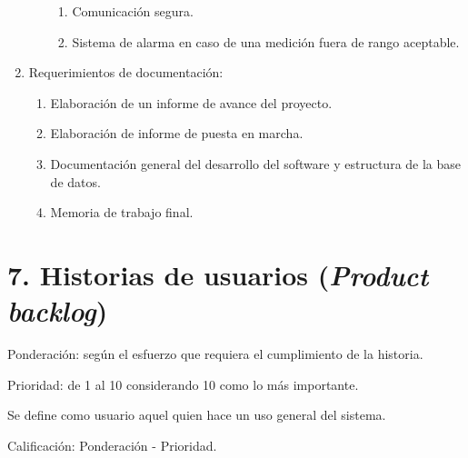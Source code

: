 \documentclass[
11pt, %
codirector, %
]{charter}
\begin{document}
\begin{enumerate}
\begin{enumerate}
\begin{enumerate}
		\item Comunicación segura.
		\item Sistema de alarma en caso de una medición fuera de rango aceptable.
		\end{enumerate}
	\end{enumerate}
\item Requerimientos de documentación:
	\begin{enumerate}
	\item Elaboración de un informe de avance del proyecto.
	\item Elaboración de informe de puesta en marcha.
	\item Documentación general del desarrollo del software y estructura de la base de datos.
	\item Memoria de trabajo final.
	\end{enumerate}	
\end{enumerate}


\section{7. Historias de usuarios (\textit{Product backlog})}
\label{sec:backlog}

Ponderación: según el esfuerzo que requiera el cumplimiento de la historia.

Prioridad: de 1 al 10 considerando 10 como lo más importante.

Se define como usuario aquel quien hace un uso general del sistema.

Calificación: Ponderación - Prioridad.
\end{document}
